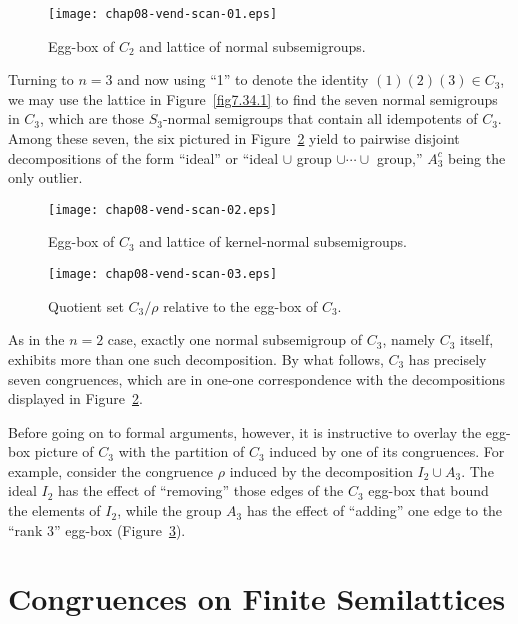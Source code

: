 \documentclass{surv-l}
\numberwithin{equation}{section}
\numberwithin{table}{section}
\numberwithin{figure}{section}
\theoremstyle{plain}
\theoremstyle{definition}
\begin{document}
\begin{figure}[!h]
\texttt{[image: chap08-vend-scan-01.eps]}
\caption{Egg-box of $C_{2}$ and lattice of normal subsemigroups.}\label{fig8.36.1}
\end{figure}

\setcounter{footnote}{0}

Turning to $n =3$ and now using ``1'' to denote the identity
$(1)(2)(3)\in C_{3}$, we may use the lattice in
Figure~\ref{fig7.34.1} to find the seven normal semigroups in
$C_{3}$, which are those $S_{3}$-normal semigroups that contain
all idempotents of $C_{3}$. Among these seven, the six pictured in
Figure~\ref{fig8.36.2} yield to pairwise disjoint decompositions
of the form ``ideal'' or ``ideal $\cup$ group $\cup\cdots\cup$
group,'' $A_{3}^{c}$ being the only outlier.

\setcounter{figure}{1}
\begin{figure}[!h]
\texttt{[image: chap08-vend-scan-02.eps]}
\caption{Egg-box of $C_{3}$ and lattice of kernel-normal subsemigroups.}\label{fig8.36.2}
\end{figure}

\begin{figure}[!h]
\texttt{[image: chap08-vend-scan-03.eps]}
\caption{Quotient set $C_{3}/\rho$ relative to the egg-box of $C_{3}$.}\label{fig8.36.3}
\end{figure}

As in the $n=2$ case, exactly one normal subsemigroup of $C_{3}$,
namely $C_{3}$ itself, exhibits more than one such decomposition.
By what follows, $C_{3}$ has precisely seven congruences, which
are in one-one correspondence with the decompositions displayed in
Figure~\ref{fig8.36.2}.

Before going on to formal arguments, however, it is instructive to
overlay the egg-box picture of $C_{3}$ with the partition of
$C_{3}$ induced by one of its congruences. For
example, consider the congruence $\rho$ induced by the
decomposition $I_{2}\cup A_{3}$. The ideal $I_{2}$ has the effect
of ``removing'' those edges of the $C_{3}$ egg-box that bound the
elements of $I_{2}$, while the group $A_{3}$ has the effect of
``adding'' one edge to the ``rank 3'' egg-box
(Figure~\ref{fig8.36.3}).

\section{Congruences on Finite Semilattices}\label{sec8.37}
\end{document}
